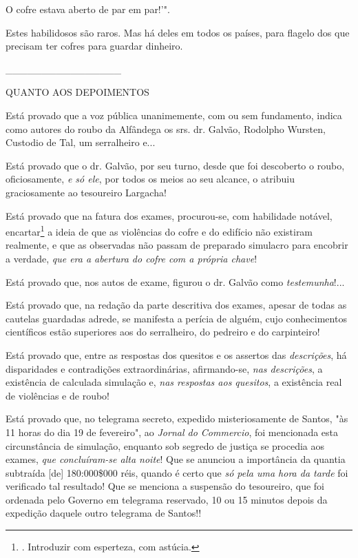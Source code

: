 O cofre estava aberto de par em par!'".

Estes habilidosos são raros. Mas há deles em todos os países, para
flagelo dos que precisam ter cofres para guardar dinheiro.

\_\_\_\_\_\_\_\_\_\_\_\_\_\_\_\_

QUANTO AOS DEPOIMENTOS

Está provado que a voz pública unanimemente, com ou sem fundamento,
indica como autores do roubo da Alfândega os srs. dr. Galvão, Rodolpho
Wursten, Custodio de Tal, um serralheiro e...

Está provado que o dr. Galvão, por seu turno, desde que foi descoberto o
roubo, oficiosamente, \emph{e só ele}, por todos os meios ao seu
alcance, o atribuiu graciosamente ao tesoureiro Largacha!

Está provado que na fatura dos exames, procurou-se, com habilidade
notável, encartar\footnote{. Introduzir com esperteza, com astúcia.} a
ideia de que as violências do cofre e do edifício não existiram
realmente, e que as observadas não passam de preparado simulacro para
encobrir a verdade, \emph{que era a abertura do cofre com a própria
chave}!

Está provado que, nos autos de exame, figurou o dr. Galvão como
\emph{testemunha}!...

Está provado que, na redação da parte descritiva dos exames, apesar de
todas as cautelas guardadas adrede, se manifesta a perícia de alguém,
cujo conhecimentos científicos estão superiores aos do serralheiro, do
pedreiro e do carpinteiro!

Está provado que, entre as respostas dos quesitos e os assertos das
\emph{descrições}, há disparidades e contradições extraordinárias,
afirmando-se, \emph{nas descrições}, a existência de calculada simulação
e, \emph{nas respostas aos quesitos}, a existência real de violências e
de roubo!

Está provado que, no telegrama secreto, expedido misteriosamente de
Santos, "às 11 horas do dia 19 de fevereiro", ao \emph{Jornal do
Commercio}, foi mencionada esta circunstância de simulação, enquanto sob
segredo de justiça se procedia aos exames, \emph{que concluíram-se alta
noite}! Que se anunciou a importância da quantia subtraída {[}de{]}
180:000\$000 réis, quando é certo que \emph{só pela uma hora da tarde}
foi verificado tal resultado! Que se menciona a suspensão do tesoureiro,
que foi ordenada pelo Governo em telegrama reservado, 10 ou 15 minutos
depois da expedição daquele outro telegrama de Santos!!

